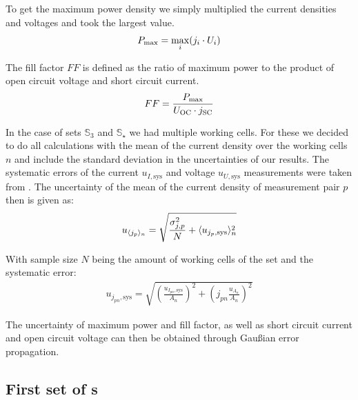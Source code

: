 To get the maximum power density we simply multiplied the current densities and voltages and took the largest value.
\begin{align}
P_{\text{max}} = \max_{i} (j_i\cdot U_i)
\end{align}

The fill factor $FF$ is defined as the ratio of maximum power to the product of open circuit voltage and short circuit current.
\begin{align}
FF = \frac{P_{\text{max}}}{U_{\text{OC}} \cdot j_{\text{SC}}}
\end{align}

In the case of sets $\mathbb{S}_3$ and $\mathbb{S}_\star$ we had multiple working cells. For these we decided to do all calculations with the mean of the current density over the working cells $n$ and include the standard deviation in the uncertainties of our results. The systematic errors of the current $u_{I,\text{sys}}$ and voltage $u_{U,\text{sys}}$ measurements were taken from \cite{keithley}. The uncertainty of the mean of the current density of measurement pair $p$ then is given as:
\begin{align}
u_{\langle j_p \rangle_n} = \sqrt{\frac{\sigma_{j,p}^2}{N} + \langle u_{j_p,\text{sys}} \rangle_n^2}
\end{align}

With sample size $N$ being the amount of working cells of the set and the systematic error:
\begin{align}
u_{j_{pn},\text{sys}} = \sqrt{ \left( \frac{ u_{I_{pn},\text{sys}}}{A_n}\right)^2+\left( j_{pn}\frac{u_{A_n}}{A_n} \right)^2}
\end{align}

The uncertainty of maximum power and fill factor, as well as short circuit current and open circuit voltage can then be obtained through Gaußian error propagation.

\subsection{First set of \BHSC s}\label{subsec:S1data}

